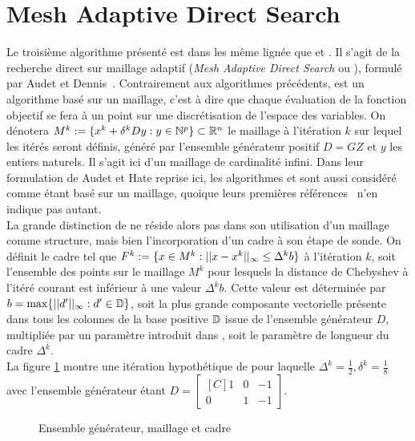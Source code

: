 \section{Mesh Adaptive Direct Search}
Le troisième algorithme présenté est dans les même lignée que \CS et \GPS. Il s'agit de la recherche direct sur maillage adaptif (\emph{Mesh Adaptive Direct Search} ou \MADS), formulé par Audet et Dennis~\cite{AuDe2006}. Contrairement aux algorithmes précédents, \MADS est un algorithme basé sur un maillage, c'est à dire que chaque évaluation de la fonction objectif se fera à un point sur une discrétisation de l'espace des variables. On dénotera $M^k:=\{x^k + \delta^kDy : y \in \mathbb{N}^p\} \subset \mathbb{R}^n$ le maillage à l'itération $k$ sur lequel les itérés seront définis, généré par l'ensemble générateur positif $D = GZ$ et $y$ les entiers naturels. Il s'agit ici d'un maillage de cardinalité infini. Dans leur formulation de Audet et Hate reprise ici, les algorithmes \CS et \GPS sont aussi considéré comme étant basé sur un maillage, quoique leurs premières références~\cite{HoJe61a,Torc97a} n'en indique pas autant.\\
La grande distinction de \MADS ne réside alors pas dans son utilisation d'un maillage comme structure, mais bien l'incorporation d'un cadre à son étape de sonde. On définit le cadre tel que $F^k:=\{x\in M^k : ||x-x^k||_{\infty} \leq \Delta^k b \}$ à l'itération $k$, soit l'ensemble des points sur le maillage $M^k$ pour lesquels la distance de Chebyshev à l'itéré courant est inférieur à une valeur $\Delta ^k b$. Cette valeur est déterminée par $b = \max\{||d'||_{\infty}:d' \in \mathbb{D}\}$, soit la plus grande composante vectorielle présente dans tous les colonnes de la base positive $\mathbb{D}$ issue de l'ensemble générateur $D$, multipliée par un paramètre introduit dans \MADS, soit le paramètre de longueur du cadre $\Delta^k$.\\
La figure \ref{fig:MADS} montre une itération hypothétique de \MADS pour laquelle $\Delta^k = \frac{1}{2}, \delta^k = \frac{1}{8}$ avec l'ensemble générateur étant
$D = \begin{bmatrix*}[C]
1 & 0 &-1\\
0 & 1 & -1
\end{bmatrix*}$. \\
\begin{figure}[H] %
	\begin{center}
	\end{center}
	\caption{Ensemble générateur, maillage et cadre}
	\label{fig:MADS}
\end{figure}
